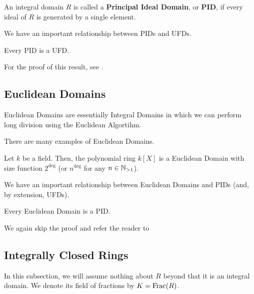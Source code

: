 \begin{boxdefinition}
    An integral domain $R$ is called a \textbf{Principal Ideal Domain}, or \textbf{PID}, if every ideal of $R$ is generated by a single element.
\end{boxdefinition}

We have an important relationship between PIDs and UFDs.

\begin{boxtheorem}
    Every PID is a UFD.
\end{boxtheorem}

For the proof of this result, see \cite[Theorem 1.2]{AmbrusPal}.

\subsection{Euclidean Domains}

Euclidean Domains are essentially Integral Domains in which we can perform long division using the Euclidean Algortihm.

\begin{boxdefinition}
    \sorry %
\end{boxdefinition}

There are many examples of Euclidean Domains.

\begin{boxexample}
    Let $k$ be a field. Then, the polynomial ring $k[X]$ is a Euclidean Domain with size function $2^{\deg}$ (or $n^{\deg}$ for any $n \in \mathbb{N}_{>1}$).
\end{boxexample}

We have an important relationship between Euclidean Domains and PIDs (and, by extension, UFDs).

\begin{boxproposition}
    Every Euclidean Domain is a PID.
\end{boxproposition}

We again skip the proof and refer the reader to \cite{}

\subsection{Integrally Closed Rings}

In this subsection, we will assume nothing about $R$ beyond that it is an integral domain. We denote its field of fractions by $K = \operatorname{Frac}\!\left( R \right)$.

